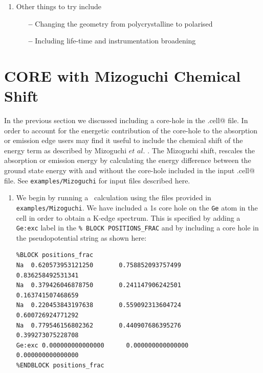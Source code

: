 \documentclass[a4paper,11pt,twoside]{book}
\begin{document}
{\begin{enumerate}
\begin{verbatim}
     %BLOCK POSITIONS_FRAC
            Si:exi    0.0000000000    0.0000000000    0.0000000000
            Si        0.5000000000    0.5000000000    0.0000000000
            Si        0.5000000000    0.0000000000    0.5000000000
            Si        0.0000000000    0.5000000000    0.5000000000
            Si        0.2500000000    0.2500000000    0.2500000000
            Si        0.7500000000    0.2500000000    0.7500000000
            Si        0.2500000000    0.7500000000    0.7500000000
            Si        0.7500000000    0.7500000000    0.2500000000
      %ENDBLOCK POSITIONS_FRAC
\end{verbatim}
Run \optados\ and compare the spectrum from the face-centred unit cell with that from the primitive unit cell.  Continue constructing larger unit cells until the core-hole spectrum stops changing with increasing separation between the periodic images.

\item Other things to try include
\begin{itemize}
\item[{\bf --}] Changing the geometry from polycrystalline to polarised
\item[{\bf --}] Including life-time and instrumentation broadening
\end{itemize}
\end{enumerate}

\section{CORE with Mizoguchi Chemical Shift}
In the previous section we discussed including a core-hole in the \verb@seedname.cell@ file. In order to account for the energetic contribution of the core-hole to the absorption or emission edge users may find it useful to include the chemical shift of the energy term as described by Mizoguchi $et$ $al.$ \cite{mizoguchi}. The Mizoguchi shift, rescales the absorption or emission energy by calculating the energy difference between the ground state energy with and without the core-hole included in the input \verb@seedname.cell@ file.  See \verb#examples/Mizoguchi# for input files described here.

\begin{enumerate}
\item We begin by running a \castep\ calculation using the files provided in \verb#examples/Mizoguchi#. We have included a 1s core hole on the \verb#Ge# atom in the cell in order to obtain a K-edge spectrum. This is specified by adding a \verb#Ge:exc# label in the \verb#% BLOCK POSITIONS_FRAC# and by including a core hole in the pseudopotential string as shown here:
\begin{verbatim}
%BLOCK positions_frac
Na  0.620573953121250       0.758852093757499       0.836258492531341
Na  0.379426046878750       0.241147906242501       0.163741507468659
Na  0.220453843197638       0.559092313604724       0.600726924771292
Na  0.779546156802362       0.440907686395276       0.399273075228708
Ge:exc 0.000000000000000      0.000000000000000      0.000000000000000
%ENDBLOCK positions_frac


\end{verbatim}
\end{enumerate}}
\end{document}
